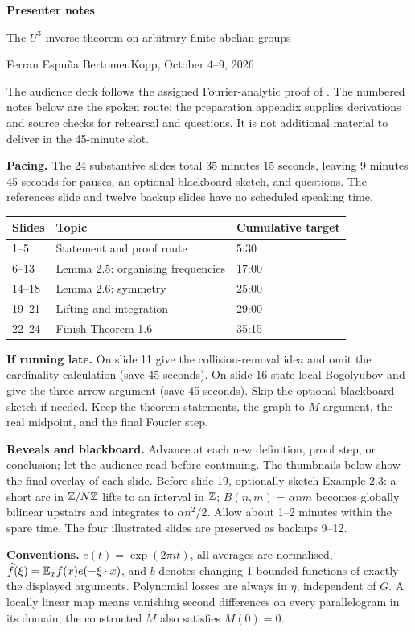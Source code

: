 \documentclass[11pt,a4paper]{article}
\begin{document}
\begin{center}
{\LARGE\bfseries Presenter notes}\par\vspace{5mm}
{\Large The $U^3$ inverse theorem on arbitrary finite abelian groups}\par\vspace{3mm}
Ferran Espu\~na Bertomeu\quad Kopp, October 4--9, 2026
\end{center}
The audience deck follows the assigned Fourier-analytic proof of .
The numbered notes below are the spoken route; the preparation appendix supplies
derivations and source checks for rehearsal and questions. It is not additional
material to deliver in the 45-minute slot.

\textbf{Pacing.} The 24 substantive slides total 35 minutes 15 seconds, leaving
9 minutes 45 seconds for pauses, an optional blackboard sketch, and questions.
The references slide and twelve
backup slides have no scheduled speaking time.

\begin{center}
\begin{tabular}{lll}
Slides & Topic & Cumulative target\\\hline
1--5 & Statement and proof route & 5:30\\
6--13 & Lemma 2.5: organising frequencies & 17:00\\
14--18 & Lemma 2.6: symmetry & 25:00\\
19--21 & Lifting and integration & 29:00\\
22--24 & Finish Theorem 1.6 & 35:15
\end{tabular}
\end{center}

\textbf{If running late.} On slide 11 give the collision-removal idea and omit
the cardinality calculation (save 45 seconds). On slide 16 state local
Bogolyubov and give the three-arrow argument (save 45 seconds).
Skip the optional blackboard sketch if needed.
Keep the theorem statements, the graph-to-$M$ argument, the real midpoint,
and the final Fourier step.

\textbf{Reveals and blackboard.} Advance at each new definition, proof step,
or conclusion; let the audience read before continuing. The thumbnails below
show the final overlay of each slide. Before slide 19, optionally sketch
Example 2.3: a short arc in $\mathbb Z/N\mathbb Z$ lifts to an interval in $\mathbb Z$;
$B(n,m)=\alpha nm$ becomes globally bilinear upstairs and integrates to
$\alpha n^2/2$. Allow about 1--2 minutes within the spare time. The four
illustrated slides are preserved as backups 9--12.

\textbf{Conventions.} $e(t)=\exp(2\pi it)$, all averages are normalised,
$\widehat f(\xi)=\mathbb E_x f(x)e(-\xi\cdot x)$, and $b$ denotes changing
1-bounded functions of exactly the displayed arguments. Polynomial losses
are always in $\eta$, independent of $G$. A locally linear map means vanishing
second differences on every parallelogram in its domain; the constructed $M$
also satisfies $M(0)=0$.



\clearpage

\end{document}
